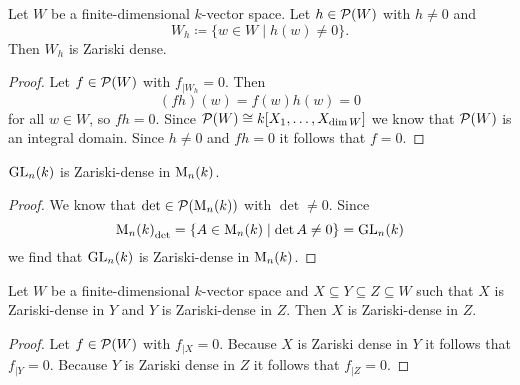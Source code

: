 \begin{lem}
  Let $W$ be a finite-dimensional $k$-vector space. Let $h \in \mathcal{P}(W)$ with $h \neq 0$ and
  \[
    W_h \coloneqq \{w \in W \mid h(w) \neq 0\}.
  \]
  Then $W_h$ is Zariski dense.
\end{lem}
\begin{proof}
  Let $f \in \mathcal{P}(W)$ with $f_{|W_h} = 0$. Then
  \[
    (fh)(w) = f(w)h(w) = 0
  \]
  for all $w \in W$, so $fh = 0$. Since $\mathcal{P}(W) \cong k[X_1, \dotsc, X_{\dim W}]$ we know that $\mathcal{P}(W)$ is an integral domain. Since $h \neq 0$ and $fh = 0$ it follows that $f = 0$.
\end{proof}


\begin{cor}
  $\operatorname{GL}_n(k)$ is Zariski-dense in $\operatorname{M}_n(k)$.
\end{cor}
\begin{proof}
  We know that $\det \in \mathcal{P}(\operatorname{M}_n(k))$ with $\det \neq 0$. Since
  \[
    {\operatorname{M}_n(k)}_{\det} = \{A \in \operatorname{M}_n(k) \mid \det A \neq 0\} = \operatorname{GL}_n(k)
  \]
  we find that $\operatorname{GL}_n(k)$ is Zariski-dense in $\operatorname{M}_n(k)$.
\end{proof}


\begin{prop}
  Let $W$ be a finite-dimensional $k$-vector space and $X \subseteq Y \subseteq Z \subseteq W$ such that $X$ is Zariski-dense in $Y$ and $Y$ is Zariski-dense in $Z$. Then $X$ is Zariski-dense in $Z$.
\end{prop}
\begin{proof}
  Let $f \in \mathcal{P}(W)$ with $f_{|X} = 0$. Because $X$ is Zariski dense in $Y$ it follows that $f_{|Y} = 0$. Because $Y$ is Zariski dense in $Z$ it follows that $f_{|Z} = 0$.
\end{proof}


